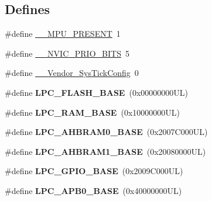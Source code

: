 \subsection*{\-Defines}
\begin{DoxyCompactItemize}
\item 
\#define \hyperlink{group___l_p_c17xx___system_ga4127d1b31aaf336fab3d7329d117f448}{\-\_\-\-\_\-\-M\-P\-U\-\_\-\-P\-R\-E\-S\-E\-N\-T}~1
\item 
\#define \hyperlink{group___l_p_c17xx___system_gae3fe3587d5100c787e02102ce3944460}{\-\_\-\-\_\-\-N\-V\-I\-C\-\_\-\-P\-R\-I\-O\-\_\-\-B\-I\-T\-S}~5
\item 
\#define \hyperlink{group___l_p_c17xx___system_gab58771b4ec03f9bdddc84770f7c95c68}{\-\_\-\-\_\-\-Vendor\-\_\-\-Sys\-Tick\-Config}~0
\item 
\hypertarget{group___l_p_c17xx___system_ga7d7417b6cd6c6975fa03de03920d27e8}{\#define {\bfseries \-L\-P\-C\-\_\-\-F\-L\-A\-S\-H\-\_\-\-B\-A\-S\-E}~(0x00000000\-U\-L)}\label{group___l_p_c17xx___system_ga7d7417b6cd6c6975fa03de03920d27e8}

\item 
\hypertarget{group___l_p_c17xx___system_ga9782814ad6434f200b65440d2ac01c2a}{\#define {\bfseries \-L\-P\-C\-\_\-\-R\-A\-M\-\_\-\-B\-A\-S\-E}~(0x10000000\-U\-L)}\label{group___l_p_c17xx___system_ga9782814ad6434f200b65440d2ac01c2a}

\item 
\hypertarget{group___l_p_c17xx___system_ga3364e6e629d92b647ead5b64146ca383}{\#define {\bfseries \-L\-P\-C\-\_\-\-A\-H\-B\-R\-A\-M0\-\_\-\-B\-A\-S\-E}~(0x2007\-C000\-U\-L)}\label{group___l_p_c17xx___system_ga3364e6e629d92b647ead5b64146ca383}

\item 
\hypertarget{group___l_p_c17xx___system_gac4e369c1f5ce40107b7ea38cbd012592}{\#define {\bfseries \-L\-P\-C\-\_\-\-A\-H\-B\-R\-A\-M1\-\_\-\-B\-A\-S\-E}~(0x20080000\-U\-L)}\label{group___l_p_c17xx___system_gac4e369c1f5ce40107b7ea38cbd012592}

\item 
\hypertarget{group___l_p_c17xx___system_ga5feb4a6692784a25eaed627661bd8f36}{\#define {\bfseries \-L\-P\-C\-\_\-\-G\-P\-I\-O\-\_\-\-B\-A\-S\-E}~(0x2009\-C000\-U\-L)}\label{group___l_p_c17xx___system_ga5feb4a6692784a25eaed627661bd8f36}

\item 
\hypertarget{group___l_p_c17xx___system_ga55cab996c3594a0f4cc459ec8e10daea}{\#define {\bfseries \-L\-P\-C\-\_\-\-A\-P\-B0\-\_\-\-B\-A\-S\-E}~(0x40000000\-U\-L)}\label{group___l_p_c17xx___system_ga55cab996c3594a0f4cc459ec8e10daea}


\end{DoxyCompactItemize}
